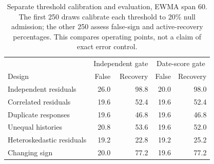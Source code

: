 \begin{table}[htbp]\centering\small
    \caption{Separate threshold calibration and evaluation, EWMA span 60. The first
    250 draws calibrate each threshold to 20\% null admission; the other 250 assess
    false-sign and active-recovery percentages. This compares operating points,
    not a claim of exact error control.}\label{tab:revised-matched}
    \begin{tabular}{lrrrr}\toprule
     & \multicolumn{2}{c}{Independent gate} & \multicolumn{2}{c}{Date-score gate}\\
    Design & False & Recovery & False & Recovery\\\midrule
    Independent residuals & 26.0 & 98.8 & 20.0 & 98.0 \\
Correlated residuals & 19.6 & 52.4 & 19.6 & 52.4 \\
Duplicate responses & 19.6 & 46.8 & 19.6 & 46.8 \\
Unequal histories & 20.8 & 53.6 & 19.6 & 52.0 \\
Heteroskedastic residuals & 19.2 & 22.8 & 19.2 & 25.2 \\
Changing sign & 20.0 & 77.2 & 19.6 & 77.2 \\
    \bottomrule\end{tabular}\end{table}
    